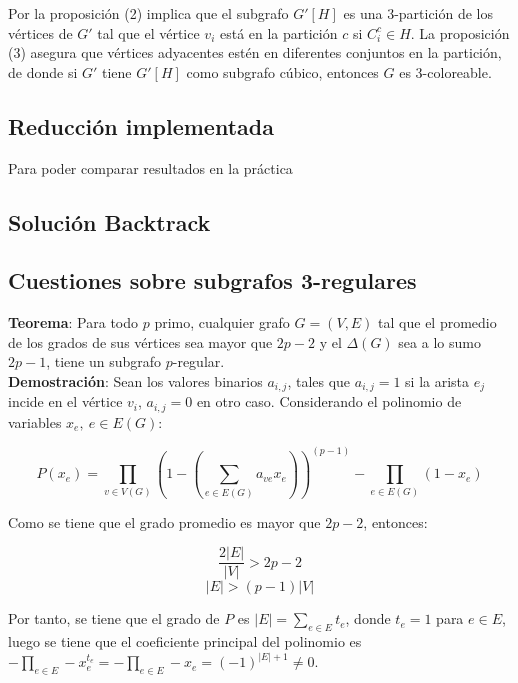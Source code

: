 \documentclass{article}
\begin{document}
Por la proposici\'on (2) implica que el subgrafo $G'[H]$ es una $3$-partici\'on de los v\'ertices de $G'$ tal que el v\'ertice
$v_i$ est\'a en la partici\'on $c$ si $C_i^c \in H$. La proposici\'on (3) asegura que v\'ertices adyacentes est\'en en diferentes conjuntos en la partici\'on, de donde
si $G'$ tiene $G'[H]$ como subgrafo c\'ubico, entonces $G$ es $3$-coloreable. \\ 

\subsection*{Reducci\'on implementada}
Para poder comparar resultados en la pr\'actica 
\subsection*{Soluci\'on Backtrack}

\subsection*{Cuestiones sobre subgrafos 3-regulares}
\textbf{Teorema}: Para todo $p$ primo, cualquier grafo $G=(V,E)$ tal que el promedio de los grados de sus v\'ertices sea mayor que 
$2p-2$ y el $\Delta(G)$ sea a lo sumo $2p -1$, tiene un subgrafo $p$-regular.\\ 

\textbf{Demostraci\'on}: Sean los valores binarios $a_{i,j}$, tales que $a_{i,j} = 1$ si la arista $e_{j}$ incide en el v\'ertice $v_i$, $a_{i,j} = 0$ en otro caso.
Considerando el polinomio de variables $x_e,~ e\in E(G)$:

$$P(x_e) = \prod_{v \in V(G)} \left( 1 - \left(\sum_{e \in E(G)} a_{ve} x_e\right)\right)^(p-1)- \prod_{e \in E(G)} (1 - x_e)$$ 

Como se tiene que el grado promedio es mayor que $2p-2$, entonces: 

$$\frac{2|E|}{|V|} > 2p-2 $$
$$|E| > (p-1)|V|$$

Por tanto, se tiene que el grado de $P$ es $|E| = \sum_{e \in E} t_e$, donde $t_e = 1$ para $e \in E$, luego se tiene que el 
coeficiente principal del polinomio es $- \prod_{e \in E}  - x_e^{t_e} = - \prod_{e \in E} - x_e = (-1)^{|E| + 1} \neq 0$.  
\end{document}
